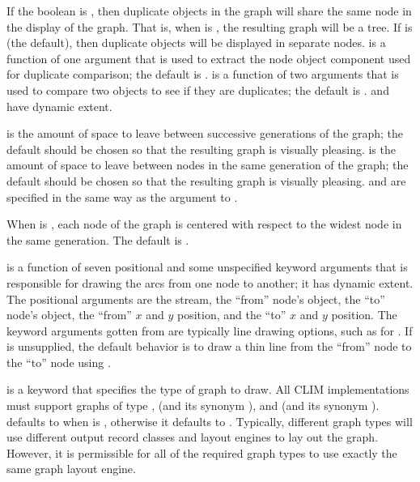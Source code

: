 If the boolean  is , then duplicate objects in
the graph will share the same node in the display of the graph.  That is, when
 is , the resulting graph will be a tree.  If
 is  (the default), then duplicate objects
will be displayed in separate nodes.   is a function of one
argument that is used to extract the node object component used for duplicate
comparison; the default is .   is a function of
two arguments that is used to compare two objects to see if they are duplicates;
the default is .   and  have
dynamic extent.

 is the amount of space to leave between successive
generations of the graph; the default should be chosen so that the resulting
graph is visually pleasing.   is the amount of
space to leave between nodes in the same generation of the graph; the default
should be chosen so that the resulting graph is visually pleasing.
 and  are specified
in the same way as the  argument to
.

When  is , each node of the graph is centered with
respect to the widest node in the same generation.  The default is .

 is a function of seven positional and some unspecified keyword
arguments that is responsible for drawing the arcs from one node to another; it
has dynamic extent.  The positional arguments are the stream, the ``from''
node's object, the ``to'' node's object, the ``from'' $x$ and $y$ position, and
the ``to'' $x$ and $y$ position.  The keyword arguments gotten from
 are typically line drawing options, such as for
.  If  is unsupplied, the default behavior is to
draw a thin line from the ``from'' node to the ``to'' node using
.

 is a keyword that specifies the type of graph to draw.  All
CLIM implementations must support graphs of type ,
 (and its synonym ), and
 (and its synonym ).  
defaults to  when  is , otherwise
it defaults to .  Typically, different graph types will use different
output record classes and layout engines to lay out the graph.  However, it is
permissible for all of the required graph types to use exactly the same graph
layout engine.


